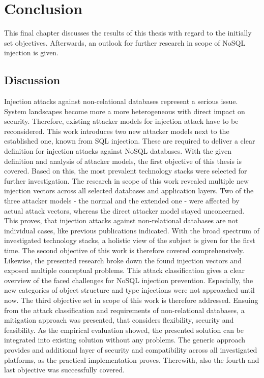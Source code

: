 \chapter{Conclusion}
This final chapter discusses the results of this thesis with regard to the initially set objectives. Afterwards, an outlook for further research in scope of NoSQL injection is given.

\section{Discussion}
Injection attacks against non-relational databases represent a serious issue. System landscapes become more a more heterogeneous with direct impact on security. Therefore, existing attacker models for injection attack have to be reconsidered. This work introduces two new attacker models next to the established one, known from SQL injection. These are required to deliver a clear definition for injection attacks against NoSQL databases. With the given definition and analysis of attacker models, the first objective of this thesis is covered. Based on this, the most prevalent technology stacks were selected for further investigation. The research in scope of this work revealed multiple new injection vectors across all selected databases and application layers. Two of the three attacker models - the normal and the extended one - were affected by actual attack vectors, whereas the direct attacker model stayed unconcerned. This proves, that injection attacks against non-relational databases are not individual cases, like previous publications indicated. With the broad spectrum of investigated technology stacks, a holistic view of the subject is given for the first time. The second objective of this work is therefore covered comprehensively. Likewise, the presented research broke down the found injection vectors and exposed multiple conceptual problems. This attack classification gives a clear overview of the faced challenges for NoSQL injection prevention. Especially, the new categories of object structure and type injections were not approached until now. The third objective set in scope of this work is therefore addressed. Ensuing from the attack classification and requirements of non-relational databases, a mitigation approach was presented, that considers flexibility, security and feasibility. As the empirical evaluation showed, the presented solution can be integrated into existing solution without any problems. The generic approach provides and additional layer of security and compatibility across all investigated platforms, as the practical implementation proves. Therewith, also the fourth and last objective was successfully covered. \\

